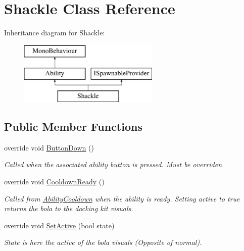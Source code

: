 \hypertarget{class_shackle}{}\section{Shackle Class Reference}
\label{class_shackle}
Inheritance diagram for Shackle\+:\begin{figure}[H]
\begin{center}
\leavevmode
\includegraphics[height=3.000000cm]{class_shackle}
\end{center}
\end{figure}
\subsection*{Public Member Functions}
\begin{DoxyCompactItemize}
\item 
override void \hyperlink{class_shackle_a19ae419f51b201f85310105c4fb2ca87}{Button\+Down} ()
\begin{DoxyCompactList}\small\item\em Called when the associated ability button is pressed. Must be overriden. \end{DoxyCompactList}\item 
override void \hyperlink{class_shackle_a81c2ef10a06ceab879574d3162dd7580}{Cooldown\+Ready} ()
\begin{DoxyCompactList}\small\item\em Called from \hyperlink{class_ability_cooldown}{Ability\+Cooldown} when the ability is ready. Setting active to true returns the bola to the docking kit visuals. \end{DoxyCompactList}\item 
override void \hyperlink{class_shackle_ac8715fddd58c3d0dd0b22cd31820ace4}{Set\+Active} (bool state)
\begin{DoxyCompactList}\small\item\em State is here the active of the bola visuals (Opposite of normal). \end{DoxyCompactList}\end{DoxyCompactItemize}
